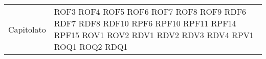 \begin{longtable}{| p{5cm} | p{5cm} |}
		\rowcolor{LightGray}
		Capitolato & ROF3 \newline
					ROF4 \newline
					ROF5 \newline
					ROF6 \newline
					ROF7 \newline
					ROF8 \newline
					ROF9 \newline
					RDF6 \newline
					RDF7 \newline
					RDF8 \newline
					RDF10 \newline
					RPF6 \newline
					RPF10 \newline
					RPF11 \newline
					RPF14 \newline
					RPF15 \newline
					ROV1 \newline
					ROV2 \newline
					RDV1 \newline
					RDV2 \newline
					RDV3 \newline
					RDV4 \newline
					RPV1 \newline
					ROQ1 \newline
					ROQ2\newline
					RDQ1\newline	
		 \\
		

\end{longtable}
